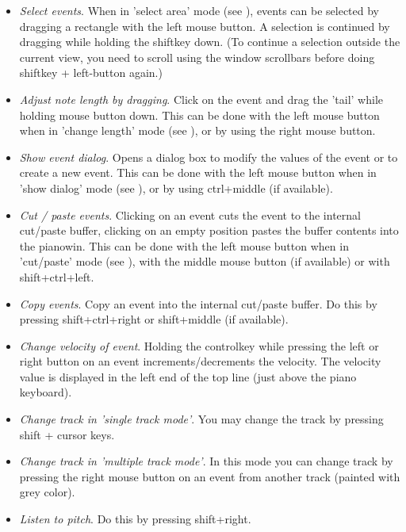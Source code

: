 \documentclass[letterpaper]{report}
\begin{document}
\begin{itemize}

\item {\em Select events}. When in 'select area' mode
(see ), events can
be selected by dragging a rectangle with the left mouse button.
A selection is continued by dragging while holding the shiftkey down. (To
continue a selection outside the current view, you need to scroll using the
window scrollbars before doing shiftkey + left-button again.)

\item {\em Adjust note length by dragging}. Click on the event and drag
the 'tail' while holding mouse button down. This can be done with the
left mouse button when in 'change length' mode
(see ), or by using the right mouse button.

\item {\em Show event dialog}. Opens a dialog box to
modify the values of the event
or to create a new event. This can be done with the left mouse button when in
'show dialog' mode
(see ), or by using ctrl+middle (if
available).

\item {\em Cut / paste events}. Clicking on an event cuts the event to the
internal cut/paste buffer, clicking on an empty position pastes the
buffer contents into the pianowin. This can be done with the left mouse
button when in 'cut/paste' mode
(see ), with the middle mouse button (if
available) or with shift+ctrl+left.

\item {\em Copy events}. Copy an event into the internal cut/paste buffer. Do
this by pressing shift+ctrl+right or shift+middle (if available).

\item {\em Change velocity of event}. Holding the controlkey while pressing the
left or right button on an event increments/decrements the velocity. The
velocity value is displayed in the left end of the top line (just
above the piano keyboard).

\item {\em Change track in 'single track mode'}. You may change the track by pressing
shift + cursor keys.

\item {\em Change track in 'multiple track mode'}. In this mode you can change track
by pressing the right mouse button on an event from another track
(painted with grey color).

\item {\em Listen to pitch}. Do this by pressing shift+right.

\end{itemize}
\end{document}
